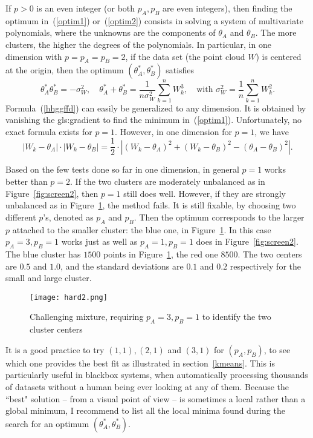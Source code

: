 \documentclass[oneside,10pt]{book}
\begin{document}
If $p>0$ is an even integer (or both $p_A,p_B$ are even integers), then finding the optimum in~(\ref{optim1}) or~(\ref{optim2}) consists in solving a system of
 multivariate polynomials, where the
 unknowns are the components of $\theta_A$ and $\theta_B$. The more clusters, the higher the degrees of the polynomials. In particular, in one dimension with $p=p_A=p_B=2$, if the data set (the point cloud $W$) is centered at the origin, then the optimum $(\theta_A^*,\theta_B^*)$ satisfies
\begin{equation}
\theta_A^* \theta_B^* =-\sigma^2_W, \quad \theta_A^*+\theta_B^*=\frac{1}{n\sigma^2_W}\sum_{k=1}^n W_k^3,
\quad \text{with } \sigma^2_W=\frac{1}{n}\sum_{k=1}^n W_k^2. \label{hhggffd}
\end{equation}
Formula~(\ref{hhggffd}) can easily be generalized to any dimension. It is obtained by vanishing the \gls{gls:gradient} to find the minimum in~(\ref{optim1}). Unfortunately, no exact formula exists for $p=1$. However, in one dimension for $p=1$, we have
$$
|W_k-\theta_A|\cdot |W_k-\theta_B| = \frac{1}{2}\cdot | (W_k-\theta_A)^2 + (W_k-\theta_B)^2-(\theta_A -\theta_B)^2 |.
$$

Based on the few tests done so far in one dimension, in general $p=1$ works better than $p=2$. If the two clusters are moderately unbalanced as in Figure~\ref{fig:screen2}, then $p=1$ still does well.
However, if they are strongly unbalanced as in Figure~\ref{fig:hard}, the method fails.  It is still fixable, by choosing two different $p$'s,  denoted as $p_A$ and $p_B$. Then the optimum
corresponds to the larger $p$ attached to
 the smaller cluster: the blue one, in Figure~\ref{fig:hard}.  In this case $p_A=3,p_B=1$ works just as well  as $p_A=1, p_B=1$ does
 in Figure~\ref{fig:screen2}.
The blue cluster has $1500$ points in Figure~\ref{fig:hard}, the red one $8500$. The two centers are $0.5$ and $1.0$,
   and the standard deviations are $0.1$ and $0.2$ respectively for the small and large cluster.

\begin{figure}[H]
\centering
\texttt{[image: hard2.png]}
\caption{Challenging mixture, requiring $p_A=3,p_B=1$ to identify the two cluster centers}
\label{fig:hard}
\end{figure}


 It is a good practice to try $(1,1), (2,1)$ and $(3,1)$ for $(p_A,p_B)$, to see which one provides the best fit as illustrated
 in section~\ref{kmeans}. This is particularly useful in blackbox systems, when automatically processing thousands of datasets without a human being ever looking at any of them.  Because the
 ``best" solution -- from a visual point of view -- is sometimes a local rather than a global minimum, I recommend to list all the local minima found during the search for an
 optimum $(\theta_A^*,\theta_B^*)$.
\end{document}
